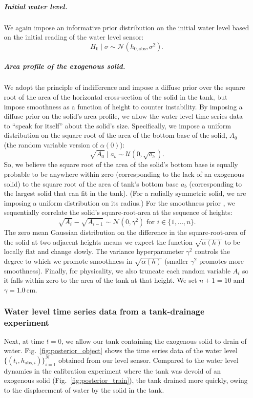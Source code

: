 \documentclass[a4paper,fleqn]{cas-dc}
\newcommand\thedata {$\{(t_i,h_{\text{obs}, i})\}_{i=1}^{N}$\xspace}
\begin{document}
\subparagraph{Initial water level.} We again impose an informative prior distribution on the initial water level based on the initial reading of the water level sensor:
\begin{equation}
	H_0 \mid \sigma \sim \mathcal{N}(h_{0, \text{obs}}, \sigma^2).
\end{equation}

\subparagraph{Area profile of the exogenous solid.}
We adopt the principle of indifference and impose a diffuse prior over the square root of the area of the horizontal cross-section of the solid in the tank, but impose smoothness as a function of height to counter instability\cite{groetsch1993inverse_tl}. 
By imposing a diffuse prior on the solid's area profile, we allow the water level time series data to ``speak for itself'' about the solid's size.
Specifically, we impose a uniform distribution on the square root of the area of the bottom base of the solid, $A_0$ (the random variable version of $\alpha(0)$):
\begin{equation}
	\sqrt{A_0} \mid a_b \sim \mathcal{U}(0, \sqrt{a_b}).
\end{equation} 
So, we believe the square root of the area of the solid's bottom base is equally probable to be anywhere within zero (corresponding to the lack of an exogenous solid) to the square root of the area of tank's bottom base $a_b$ (corresponding to the largest solid that can fit in the tank).
(For a radially symmetric solid, we are imposing a uniform distribution on its radius.)
For the smoothness prior \cite{calvetti2018inverse}, we sequentially correlate the solid's square-root-area at the sequence of heights: 
\begin{equation}
 \sqrt{A_i} - \sqrt{A_{i-1}} \sim \mathcal{N}(0, \gamma^2) \text{ for } i \in \{1, ..., n\}.
\end{equation} 
The zero mean Gaussian distribution on the difference in the square-root-area of the solid at two adjacent heights means we expect the function $\sqrt{\alpha(h)}$ to be locally flat and change slowly. 
The variance hyperparameter $\gamma^2$ controls the degree to which we promote smoothness in $\sqrt{\alpha (h)}$ (smaller $\gamma^2$ promotes more smoothness). 
Finally, for physicality, we also truncate each random variable $A_i$ so it falls within zero to the area of the tank at that height.
We set $n+1=10$ and $\gamma=1.0$\,cm.

\subsubsection{Water level time series data from a tank-drainage experiment}
Next, at time $t=0$, we allow our tank containing the exogenous solid to drain of water. Fig.~\ref{fig:posterior_object} shows the time series data of the water level \thedata obtained from our level sensor. Compared to the water level dynamics in the calibration experiment where the tank was devoid of an exogenous solid (Fig.~\ref{fig:posterior_train}), the tank drained more quickly, owing to the displacement of water by the solid in the tank.
\end{document}
